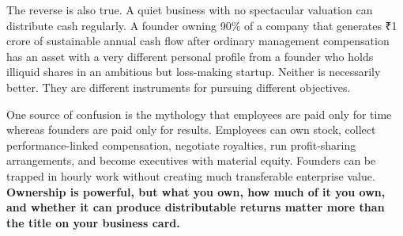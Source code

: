 The reverse is also true. A quiet business with no spectacular valuation can distribute cash regularly. A founder owning 90\% of a company that generates ₹1 crore of sustainable annual cash flow after ordinary management compensation has an asset with a very different personal profile from a founder who holds illiquid shares in an ambitious but loss-making startup. Neither is necessarily better. They are different instruments for pursuing different objectives.

One source of confusion is the mythology that employees are paid only for time whereas founders are paid only for results. Employees can own stock, collect performance-linked compensation, negotiate royalties, run profit-sharing arrangements, and become executives with material equity. Founders can be trapped in hourly work without creating much transferable enterprise value. \textbf{Ownership is powerful, but what you own, how much of it you own, and whether it can produce distributable returns matter more than the title on your business card.}
